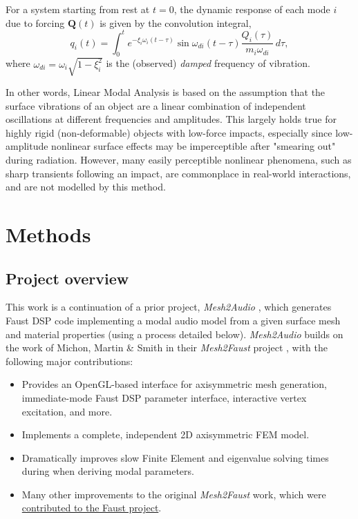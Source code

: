 \documentclass[12pt]{article}
\newcommand{\vct}[1]{\mathbf{#1}}
\begin{document}
For a system starting from rest at $t=0$, the dynamic response of each mode $i$ due to forcing $\vct{Q}(t)$ is given by the convolution integral,
$$q_i(t) = \int_{0}^{t} e^{-\xi_i \omega_i (t-\tau)} \sin \omega_{di} (t- \tau) \frac{Q_i(\tau)}{m_i \omega_{di}} \, d\tau,$$
where $\omega_{di} = \omega_i \sqrt{1 - \xi_i^2}$ is the (observed) \textit{damped} frequency of vibration.

In other words, Linear Modal Analysis is based on the assumption that the surface vibrations of an object are a linear combination of independent oscillations at different frequencies and amplitudes.
This largely holds true for highly rigid (non-deformable) objects with low-force impacts, especially since low-amplitude nonlinear surface effects may be imperceptible after "smearing out" during radiation.
However, many easily perceptible nonlinear phenomena, such as sharp transients following an impact, are commonplace in real-world interactions, and are not modelled by this method.

\section{Methods}

\subsection{Project overview}

This work is a continuation of a prior project, \textit{Mesh2Audio} \cite{mesh2audio}, which generates Faust DSP code implementing a modal audio model from a given surface mesh and material properties (using a process detailed below).
\textit{Mesh2Audio} builds on the work of Michon, Martin \& Smith in their \textit{Mesh2Faust} project \cite{michon_mesh2faust}, with the following major contributions:
\begin{itemize}
  \item Provides an OpenGL-based interface for axisymmetric mesh generation, immediate-mode Faust DSP parameter interface, interactive vertex excitation, and more.
  \item Implements a complete, independent 2D axisymmetric FEM model.
  \item Dramatically improves slow Finite Element and eigenvalue solving times during when deriving modal parameters.
  \item Many other improvements to the original \textit{Mesh2Faust} work, which were \href{https://github.com/grame-cncm/faust/pull/870}{contributed to the Faust project}.
\end{itemize}
\end{document}
